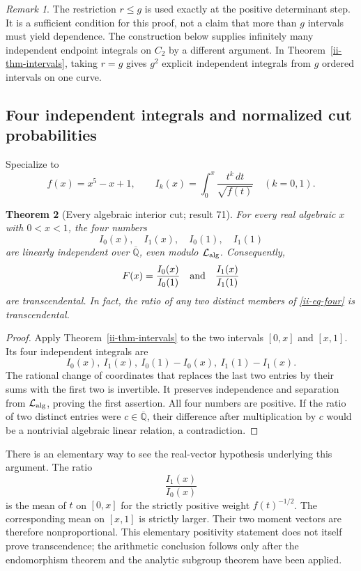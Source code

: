 \documentclass[11pt,a4paper]{article}
\newtheorem{theorem}{Theorem}[section]
\theoremstyle{definition}
\theoremstyle{remark}
\newtheorem{remark}[theorem]{Remark}
\numberwithin{equation}{section}
\newcommand{\Qbar}{\overline{\mathbb Q}}
\begin{document}
\begin{remark}\label{ii-rem-rg}
The restriction $r\le g$ is used exactly at the positive determinant
step.  It is a sufficient condition for this proof, not a claim that more
than $g$ intervals must yield dependence.  The construction below supplies
infinitely many independent endpoint integrals on $C_2$ by a different
argument.  In Theorem~\ref{ii-thm-intervals}, taking $r=g$ gives $g^2$
explicit independent integrals from $g$ ordered intervals on one curve.
\end{remark}

\subsection{Four independent integrals and normalized cut probabilities}

Specialize to
\[
 f(x)=x^5-x+1,\qquad
 I_k(x)=\int_0^x\frac{t^k\,dt}{\sqrt{f(t)}}\quad(k=0,1).
\]

\begin{theorem}[Every algebraic interior cut; result 71]
\label{ii-thm-four}
For every real algebraic $x$ with $0<x<1$, the four numbers
\begin{equation}\label{ii-eq-four}
 I_0(x),\quad I_1(x),\quad I_0(1),\quad I_1(1)
\end{equation}
are linearly independent over $\Qbar$, even modulo
$\mathcal L_{\rm alg}$.  Consequently,
\begin{equation}\label{ii-eq-normalized}
 F(x)=\frac{I_0(x)}{I_0(1)}
 \quad\hbox{and}\quad
 \frac{I_1(x)}{I_1(1)}
\end{equation}
are transcendental.  In fact, the ratio of any two distinct members of
\eqref{ii-eq-four} is transcendental.
\end{theorem}
\begin{proof}
Apply Theorem~\ref{ii-thm-intervals} to the two intervals $[0,x]$ and
$[x,1]$.  Its four independent integrals are
\[
 I_0(x),\ I_1(x),\ I_0(1)-I_0(x),\ I_1(1)-I_1(x).
\]
The rational change of coordinates that replaces the last two entries by
their sums with the first two is invertible.  It preserves independence
and separation from $\mathcal L_{\rm alg}$, proving the first assertion.
All four numbers are positive.  If the ratio of two distinct entries were
$c\in\Qbar$, their difference after multiplication by $c$ would be a
nontrivial algebraic linear relation, a contradiction.
\end{proof}

There is an elementary way to see the real-vector hypothesis underlying
this argument.  The ratio
\[
 \frac{I_1(x)}{I_0(x)}
\]
is the mean of $t$ on $[0,x]$ for the strictly positive weight
$f(t)^{-1/2}$.  The corresponding mean on $[x,1]$ is strictly larger.
Their two moment vectors are therefore nonproportional.  This elementary
positivity statement does not itself prove transcendence; the arithmetic
conclusion follows only after the endomorphism theorem and the analytic
subgroup theorem have been applied.
\end{document}

